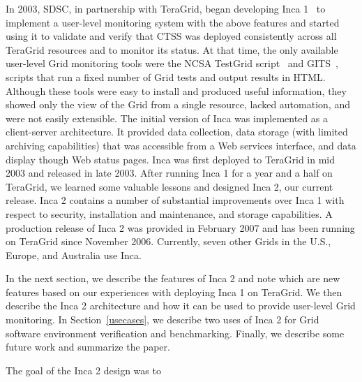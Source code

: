 \documentclass[times,10pt,twocolumn]{article}
\begin{document}
In 2003, SDSC, in partnership with TeraGrid, began developing Inca
1~\cite{inca1} to implement a user-level monitoring system with the above
features and started using it to validate and
verify that CTSS was deployed consistently across all TeraGrid resources and
to monitor its status.  At that time, the only available user-level Grid
monitoring tools were the NCSA TestGrid script~\cite{ncsa-test} and
GITS~\cite{gits}, scripts that run a fixed number of Grid tests and output
results in HTML.  Although these tools were easy to install and produced
useful information, they showed only the view of the Grid from a single
resource, lacked automation, and were not easily extensible.  The initial
version of Inca was implemented as a client-server architecture.  It provided
data collection, data storage (with limited archiving capabilities) that was
accessible from a Web services interface, and data display though Web status
pages.  Inca was first deployed to TeraGrid in mid 2003 and released in late
2003. After running Inca 1 for a year and a half on TeraGrid, we learned some
valuable lessons and designed Inca 2, our current release.  Inca 2
contains a number of substantial improvements over Inca 1 with respect to
security, installation and maintenance, and storage capabilities.  A
production release of Inca 2 was provided in February 2007 and has been
running on TeraGrid since November 2006.  Currently, seven other Grids in the
U.S., Europe, and Australia use Inca.  

In the next section, we describe the features of Inca 2 and note which
are new features based on our experiences with deploying Inca 1 on TeraGrid.
We then describe the Inca 2 architecture and how it can be used to provide
user-level Grid monitoring.  In Section~\ref{usecases}, we describe two 
uses of Inca 2 for Grid software environment verification and benchmarking.  
Finally, we describe some future work and summarize the paper.

  
The goal of the Inca 2 design was to 
\end{document}
